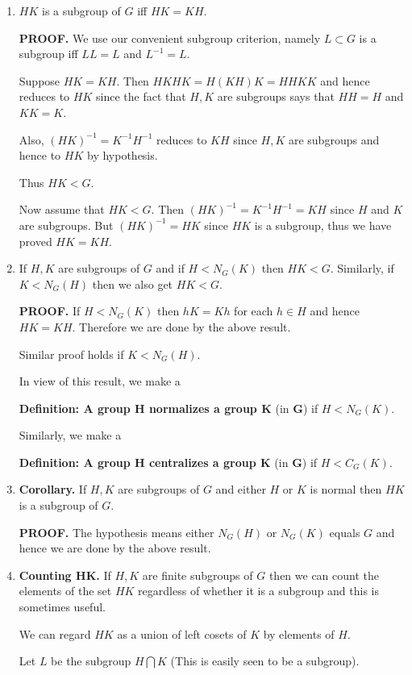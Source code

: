 \documentclass[12pt]{article}
\newcommand{\deff}[1]{{\bf Definition: #1} }
\begin{document}
\begin{enumerate}
\item $HK$ is a subgroup of $G$ iff $HK=KH$.

{\bf PROOF.} We use our convenient subgroup criterion, namely $L\subset G$ 
is a subgroup iff $LL=L$ and $L^{-1}=L$.

Suppose $HK=KH$. Then $HKHK=H(KH)K = HHKK$ and hence reduces to $HK$
since the fact that $H,K$ are subgroups says that $HH=H$ and $KK=K$.

Also, $(HK)^{-1} = K^{-1}H^{-1}$ reduces to $KH$ since $H,K$ are
subgroups and hence to $HK$ by hypothesis.

Thus $HK<G$.

Now assume that $HK<G$. 
Then $(HK)^{-1}=K^{-1}H^{-1} = KH$ since $H$ and $K$ are subgroups. But
$(HK)^{-1}=HK$ since $HK$ is a subgroup, thus we have proved $HK=KH$.

\item If $H,K$ are subgroups of $G$ and if $H<N_G(K)$ then $HK<G$.
Similarly, if $K<N_G(H)$ then we also get $HK<G$.

{\bf PROOF.} 
If $H<N_G(K)$ then $hK=Kh$ for each $h\in H$ and hence $HK=KH$.
Therefore we are done by the above result.

Similar proof holds if $K<N_G(H)$.

In view of this result, we make a 

\deff{A group $\mathbf{H}$ normalizes a group $\mathbf{K}$} (in
$\mathbf{G}$) if $H<N_G(K)$.

Similarly, we make a 

\deff{A group $\mathbf{H}$ centralizes a group $\mathbf{K}$} (in
$\mathbf{G}$) if $H<C_G(K)$.


\item {\bf Corollary.} If $H,K$ are subgroups of $G$ and either $H$ or
$K$ is normal then $HK$ is a subgroup of $G$. 

{\bf PROOF.} The hypothesis means either $N_G(H)$ or $N_G(K)$ equals $G$ 
and hence we are done by the above result.

\item {\bf Counting $\mathbf{HK}$.}
If $H,K$ are finite subgroups of $G$ then we can count the elements of the set
$HK$ regardless of whether it is a subgroup and this is sometimes
useful.

We can regard $HK$ as a union of left cosets of $K$ by elements of $H$.

Let $L$ be the subgroup $H\bigcap K$ (This is easily seen to be a
subgroup).


\end{enumerate}
\end{document}
